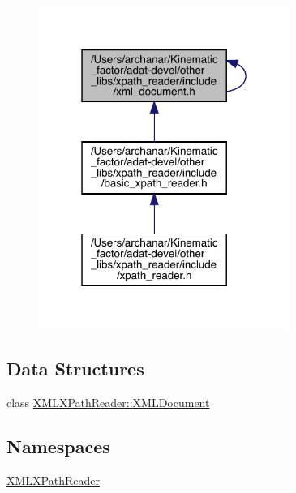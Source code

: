 \begin{figure}[H]
\begin{center}
\leavevmode
\includegraphics[width=232pt]{d7/d01/adat-devel_2other__libs_2xpath__reader_2include_2xml__document_8h__dep__incl}
\end{center}
\end{figure}
\subsection*{Data Structures}
\begin{DoxyCompactItemize}
\item 
class \mbox{\hyperlink{classXMLXPathReader_1_1XMLDocument}{X\+M\+L\+X\+Path\+Reader\+::\+X\+M\+L\+Document}}
\end{DoxyCompactItemize}
\subsection*{Namespaces}
\begin{DoxyCompactItemize}
\item 
 \mbox{\hyperlink{namespaceXMLXPathReader}{X\+M\+L\+X\+Path\+Reader}}
\end{DoxyCompactItemize}
